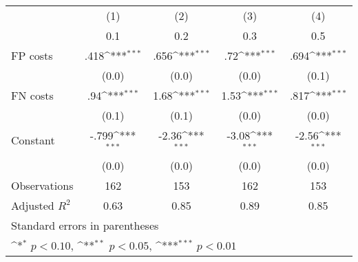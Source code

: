 {
\def\sym#1{\ifmmode^{#1}\else\(^{#1}\)\fi}
\begin{tabular}{l*{4}{c}}
\hline\hline
                &\multicolumn{1}{c}{(1)}&\multicolumn{1}{c}{(2)}&\multicolumn{1}{c}{(3)}&\multicolumn{1}{c}{(4)}\\
                &\multicolumn{1}{c}{0.1}&\multicolumn{1}{c}{0.2}&\multicolumn{1}{c}{0.3}&\multicolumn{1}{c}{0.5}\\
\hline
FP costs        &     .418\sym{***}&     .656\sym{***}&      .72\sym{***}&     .694\sym{***}\\
                &    (0.0)         &    (0.0)         &    (0.0)         &    (0.1)         \\
FN costs        &      .94\sym{***}&     1.68\sym{***}&     1.53\sym{***}&     .817\sym{***}\\
                &    (0.1)         &    (0.1)         &    (0.0)         &    (0.0)         \\
Constant        &    -.799\sym{***}&    -2.36\sym{***}&    -3.08\sym{***}&    -2.56\sym{***}\\
                &    (0.0)         &    (0.0)         &    (0.0)         &    (0.0)         \\
\hline
Observations    &      162         &      153         &      162         &      153         \\
Adjusted \(R^{2}\)&     0.63         &     0.85         &     0.89         &     0.85         \\
\hline\hline
\multicolumn{5}{l}{\footnotesize Standard errors in parentheses}\\
\multicolumn{5}{l}{\footnotesize \sym{*} \(p<0.10\), \sym{**} \(p<0.05\), \sym{***} \(p<0.01\)}\\
\end{tabular}
}
